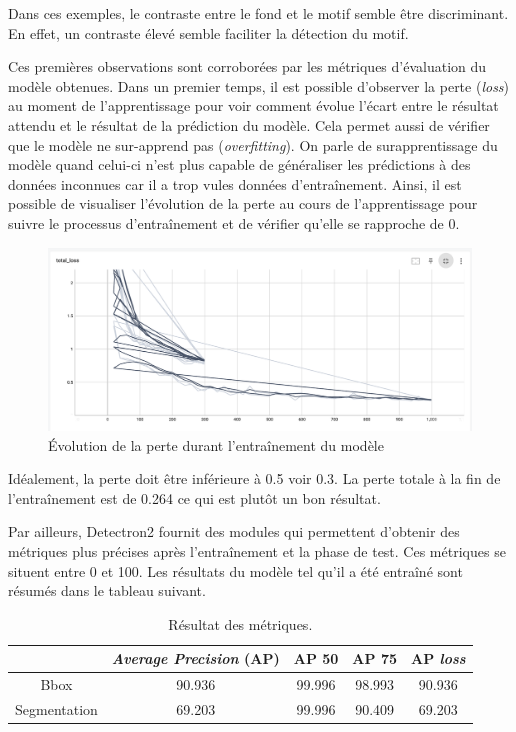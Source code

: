 \documentclass[a4paper, twoside, 12pt]{book}
\begin{document}
Dans ces exemples, le contraste entre le fond et le motif semble être discriminant. En effet, un contraste élevé semble faciliter la détection du motif.

Ces premières observations sont corroborées par les métriques d'évaluation du modèle obtenues. Dans un premier temps, il est possible d'observer la perte (\textit{loss}) au moment de l'apprentissage pour voir comment évolue l'écart entre le résultat attendu et le résultat de la prédiction du modèle. Cela permet aussi de vérifier que le modèle ne sur-apprend pas (\textit{overfitting}). On parle de surapprentissage du modèle quand celui-ci n'est plus capable de généraliser les prédictions à des données inconnues car il a trop \og vu\fg \:les données d'entraînement. Ainsi, il est possible de visualiser l'évolution de la perte au cours de l'apprentissage pour suivre le processus d'entraînement et de vérifier qu'elle se rapproche de 0.

\begin{figure}[!h]
    \centering
    \includegraphics[width=16cm]{images/loss1000iter.png}
    \caption{Évolution de la perte durant l'entraînement du modèle}
    \label{lossIter} 
\end{figure}

\noindent Idéalement, la perte doit être inférieure à 0.5 voir 0.3. La perte totale à la fin de l'entraînement est de 0.264 ce qui est plutôt un bon résultat.

Par ailleurs, Detectron2 fournit des modules qui permettent d'obtenir des métriques plus précises après l'entraînement et la phase de test. Ces métriques se situent entre 0 et 100. Les résultats du modèle tel qu'il a été entraîné sont résumés dans le tableau suivant. 

\begin{table}[!h]
    \centering
    \begin{tabular}{|c|c|c|c|c|}
        \hline
        & \cellcolor{blue!20}\textbf{\textit{Average Precision} (AP)}& \cellcolor{blue!20} \textbf{AP 50} & \cellcolor{blue!20} \textbf{AP 75} & \cellcolor{blue!20} \textbf{AP \textit{loss}} \\ \hline \hline
         Bbox & 90.936 & 99.996 & 98.993 & 90.936 \\ \hline
         Segmentation & 69.203 & 99.996 & 90.409 & 69.203 \\ \hline
    \end{tabular}
    \caption{Résultat des métriques.}
    \label{tab:metrics}
\end{table}
\end{document}
